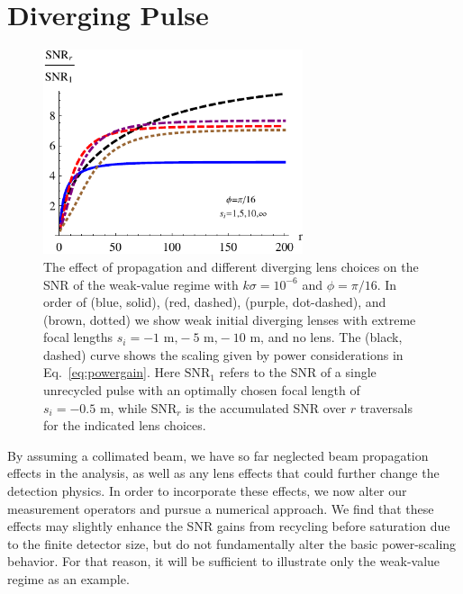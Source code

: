 \section{Diverging Pulse}\label{sec:diverging}
\begin{figure}[t]
  \includegraphics[width=3in]{PulsedRecycling/Figures/snr_plateaus.pdf}
  \caption{The effect of propagation and different diverging lens choices on the SNR of the weak-value regime with $k\sigma = 10^{-6}$ and $\phi = \pi/16$.  In order of (blue, solid), (red, dashed), (purple, dot-dashed), and (brown, dotted) we show weak initial diverging lenses with extreme focal lengths $s_i = -1\text{ m,} -5\text{ m,} -10\text{ m,}$ and no lens.  The (black, dashed) curve shows the scaling given by power considerations in Eq.~\eqref{eq:powergain}. Here $\text{SNR}_1$ refers to the SNR of a single unrecycled pulse with an optimally chosen focal length of $s_i = -0.5\text{ m}$, while $\text{SNR}_r$ is the accumulated SNR over $r$ traversals for the indicated lens choices. }  
  \label{fig:snrplateaus}
\end{figure}
By assuming a collimated beam, we have so far neglected beam propagation effects in the analysis, as well as any lens effects that could further change the detection physics.  In order to incorporate these effects, we now alter our measurement operators and pursue a numerical approach.  We find that these effects may slightly enhance the SNR gains from recycling before saturation due to the finite detector size, but do not fundamentally alter the basic power-scaling behavior.  For that reason, it will be sufficient to illustrate only the weak-value regime as an example.

